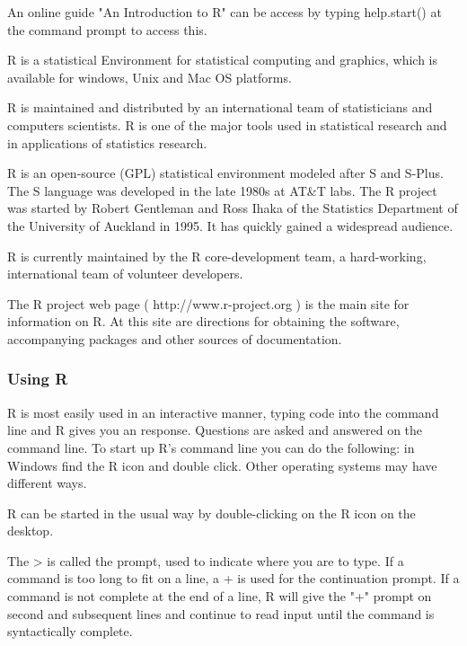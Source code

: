 \begin{frame}
An online guide "An Introduction to R" can be access by typing help.start() at the command prompt to access this.

R is a statistical Environment for statistical computing and graphics, which is available for windows, Unix and Mac OS platforms.

R is maintained and distributed by an international team of statisticians and computers scientists.
R is one of the major tools used in statistical research and in applications of statistics research.

R is an open-source (GPL) statistical environment modeled after S and S-Plus. The S language was developed in the late 1980s at AT&T labs. The R project was started by Robert Gentleman and Ross Ihaka of the Statistics Department of the University of Auckland in 1995. It has quickly gained a widespread audience. 
\end{frame}
\begin{frame}
R is currently maintained by the R core-development team, a hard-working, international team of volunteer developers. 

The R project web page ( http://www.r-project.org ) is the main site for information on R. At this site are directions for obtaining the software, accompanying packages and other sources of documentation.

\end{frame}
\begin{frame}
\frametitle{Using R}
R is most easily used in an interactive manner, typing code into the command line and R gives you an response. Questions are asked and answered on the command line. To start up R's command line you can do the following: in Windows find the R icon and double click. Other operating systems may have different ways.

R can be started in the usual way by double-clicking on the R icon on the desktop.

\end{frame}
\begin{frame}
The > is called the prompt, used to indicate where you are to type. If a command is too long to fit on a line, a + is used for the continuation prompt.
If a command is not complete at the end of a line, R will give the "+" prompt on second and subsequent lines and continue to read input until the command is syntactically complete.
\end{frame}
